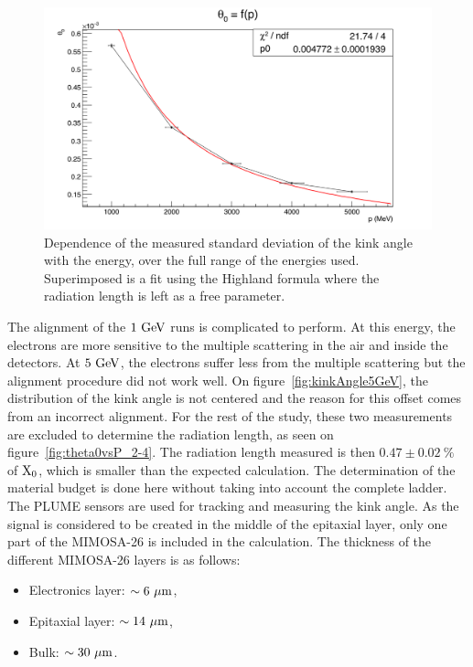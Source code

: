    \begin{figure}[!h]
     \centering
     \includegraphics[width = \textwidth]{Pictures/X0/theta0VsP_all.png}
     \caption{Dependence of the measured standard deviation of the kink angle with the energy, over the full range of the energies used. Superimposed is a fit using the Highland formula where the radiation length is left as a free parameter.}
     \label{fig:theta0vsP_all}
   \end{figure}

   The alignment of the $1~\rm{GeV}$ runs is complicated to perform.
   At this energy, the electrons are more sensitive to the multiple scattering in the air and inside the detectors.
   At $5~\rm{GeV}$, the electrons suffer less from the multiple scattering but the alignment procedure did not work well. 
   On figure~\ref{fig:kinkAngle5GeV}, the distribution of the kink angle is not centered and the reason for this offset comes from an incorrect alignment.
   For the rest of the study, these two measurements are excluded to determine the radiation length, as seen on figure~\ref{fig:theta0vsP_2-4}.
   The radiation length measured is then $0.47 \pm 0.02~\%$ of $\rm{X_0}$, which is smaller than the expected calculation.
   The determination of the material budget is done here without taking into account the complete ladder.
   The \gls{PLUME} sensors are used for tracking and measuring the kink angle.
   As the signal is considered to be created in the middle of the epitaxial layer, only one part of the \gls{MIMOSA}-26 is included in the calculation.
   The thickness of the different \gls{MIMOSA}-26 layers is as follows:
   
   \begin{itemize}
     \item Electronics layer: $\sim 6~\rm{\mu m}$,
     \item Epitaxial layer: $\sim 14~\rm{\mu m}$,
     \item Bulk: $\sim 30~\rm{\mu m}$.
   \end{itemize}

